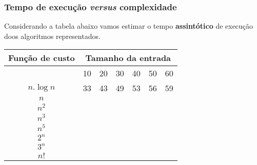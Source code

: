 \begin{frame}
	\frametitle{Tempo de execução \textit{versus} complexidade}
	\par Considerando a tabela abaixo vamos estimar o tempo \textbf{assintótico} de execução doos algoritmos representados.\newline
	
	\begin{center}
		\begin{tabular}{|c|c|c|c|c|c|c|}
			\hline
			\rule[-1ex]{0pt}{2.5ex} Função de custo & \multicolumn{6}{c|}{Tamanho da entrada} \\
			\hline
			\rule[-1ex]{0pt}{2.5ex}  & 10 & 20 & 30 & 40 & 50 & 60 \\
			\hline
			\rule[-1ex]{0pt}{2.5ex} $n.\log n$ & 33 & 43 & 49 & 53 & 56 & 59 \\
			\hline
			\rule[-1ex]{0pt}{2.5ex} $n$ &  &  &  &  &  &  \\
			\hline
			\rule[-1ex]{0pt}{2.5ex} $n^2$ &  &  &  &  &  &  \\
			\hline
			\rule[-1ex]{0pt}{2.5ex} $n^3$ &  &  &  &  &  &  \\
			\hline
			\rule[-1ex]{0pt}{2.5ex} $n^5$ &  &  &  &  &  &  \\
			\hline
			\rule[-1ex]{0pt}{2.5ex} $2^n$ &  &  &  &  &  &  \\
			\hline
			\rule[-1ex]{0pt}{2.5ex} $3^n$ &  &  &  &  &  &  \\
			\hline
			\rule[-1ex]{0pt}{2.5ex} $n!$ &  &  &  &  &  &  \\
			\hline
		\end{tabular}
	\end{center}
\end{frame}

